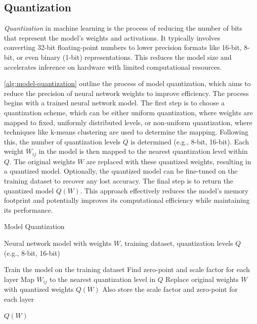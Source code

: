     \subsection{Quantization}
    \textit{Quantization} in machine learning is the process of reducing the number of bits that represent the model's weights and activations. It typically involves converting 32-bit floating-point numbers to lower precision formats like 16-bit, 8-bit, or even binary (1-bit) representations. This reduces the model size and accelerates inference on hardware with limited computational resources.

    \autoref{alg:model-quantization} outline the process of model quantization, which aims to reduce the precision of neural network weights to improve efficiency. The process begins with a trained neural network model. The first step is to choose a quantization scheme, which can be either uniform quantization, where weights are mapped to fixed, uniformly distributed levels, or non-uniform quantization, where techniques like k-means clustering are used to determine the mapping. Following this, the number of quantization levels $Q$ is determined (e.g., 8-bit, 16-bit). Each weight $W_{ij}$ in the model is then mapped to the nearest quantization level within $Q$. The original weights $W$ are replaced with these quantized weights, resulting in a quantized model. Optionally, the quantized model can be fine-tuned on the training dataset to recover any lost accuracy. The final step is to return the quantized model $Q(W)$. This approach effectively reduces the model's memory footprint and potentially improves its computational efficiency while maintaining its performance.
    
    \begin{algorithm}[H]
        \caption{Model Quantization}
        \label{alg:model-quantization}
        \begin{algorithmic}[1]
        \REQUIRE Neural network model with weights $W$, training dataset, quantization levels $Q$ (e.g., 8-bit, 16-bit)
        
        \STATE Train the model on the training dataset
        \STATE Find zero-point and scale factor for each layer
            \STATE Map $W_{ij}$ to the nearest quantization level in $Q$
        \ENDFOR
        \STATE Replace original weights $W$ with quantized weights $Q(W)$
        \STATE Also store the scale factor and zero-point for each layer
        
        \RETURN $Q(W)$
        \end{algorithmic}
    \end{algorithm}
        

